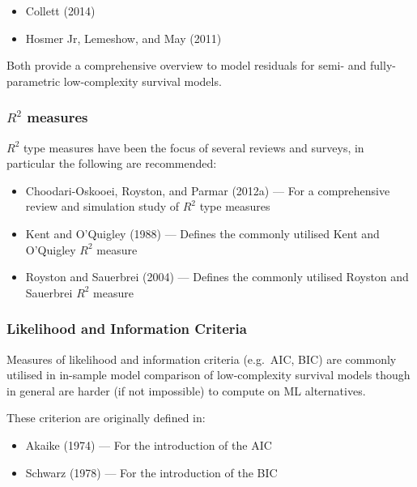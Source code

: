 \documentclass[
  letterpaper,
]{scrbook}
\providecommand{\tightlist}{%
  \setlength{\itemsep}{0pt}\setlength{\parskip}{0pt}}\usepackage{longtable,booktabs,array}
\theoremstyle{plain}
\theoremstyle{definition}
\theoremstyle{remark}
\begin{document}
\begin{itemize}
\tightlist
\item
  Collett (2014)
\item
  Hosmer Jr, Lemeshow, and May (2011)
\end{itemize}

Both provide a comprehensive overview to model residuals for semi- and
fully-parametric low-complexity survival models.

\hypertarget{r2-measures}{%
\subsubsection*{\texorpdfstring{\(R^2\)
measures}{R\^{}2 measures}}\label{r2-measures}}

\(R^2\) type measures have been the focus of several reviews and
surveys, in particular the following are recommended:

\begin{itemize}
\tightlist
\item
  Choodari-Oskooei, Royston, and Parmar (2012a) --- For a comprehensive
  review and simulation study of \(R^2\) type measures
\item
  Kent and O'Quigley (1988) --- Defines the commonly utilised Kent and
  O'Quigley \(R^2\) measure
\item
  Royston and Sauerbrei (2004) --- Defines the commonly utilised Royston
  and Sauerbrei \(R^2\) measure
\end{itemize}

\hypertarget{likelihood-and-information-criteria}{%
\subsubsection*{Likelihood and Information
Criteria}\label{likelihood-and-information-criteria}}

Measures of likelihood and information criteria (e.g.~AIC, BIC) are
commonly utilised in in-sample model comparison of low-complexity
survival models though in general are harder (if not impossible) to
compute on ML alternatives.

These criterion are originally defined in:

\begin{itemize}
\tightlist
\item
  Akaike (1974) --- For the introduction of the AIC
\item
  Schwarz (1978) --- For the introduction of the BIC
\end{itemize}
\end{document}
